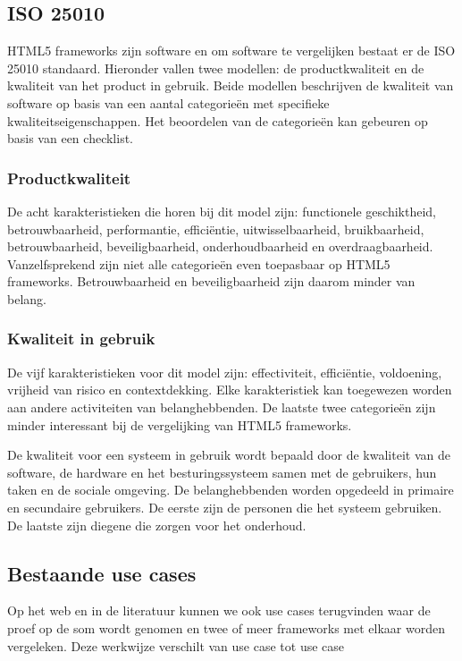 \subsection{ISO 25010}
HTML5 frameworks zijn software en om software te vergelijken bestaat er de ISO 25010 standaard.  Hieronder vallen twee modellen:  de productkwaliteit en de kwaliteit van het product in gebruik.  Beide modellen beschrijven de kwaliteit van software op basis van een aantal categorieën met specifieke kwaliteitseigenschappen. Het beoordelen van de categorieën kan gebeuren op basis van een checklist. 
 
\subsubsection{Productkwaliteit}
De acht karakteristieken die horen bij dit model zijn: functionele geschiktheid,  betrouwbaarheid,  performantie, efficiëntie, uitwisselbaarheid,  bruikbaarheid,  betrouwbaarheid, beveiligbaarheid,  onderhoudbaarheid en overdraagbaarheid.   Vanzelfsprekend zijn niet alle categorieën even toepasbaar op HTML5 frameworks.  Betrouwbaarheid en beveiligbaarheid zijn daarom minder van belang.

\subsubsection{Kwaliteit in gebruik}
De vijf karakteristieken voor dit model zijn: effectiviteit,  efficiëntie,  voldoening,  vrijheid van risico en contextdekking. Elke karakteristiek kan toegewezen worden aan andere activiteiten van belanghebbenden. De laatste twee categorieën zijn minder interessant bij de vergelijking van HTML5 frameworks.

De kwaliteit voor een systeem in gebruik wordt bepaald door de kwaliteit van de software,  de hardware en het besturingssysteem samen met de gebruikers, hun taken en de sociale omgeving.  De belanghebbenden worden opgedeeld in primaire en secundaire gebruikers.  De eerste zijn de personen die het systeem gebruiken. De laatste zijn diegene die zorgen voor het onderhoud.

\subsection{Bestaande use cases}
Op het web en in de literatuur kunnen we ook use cases terugvinden waar de proef op de som wordt genomen en twee of meer frameworks met elkaar worden vergeleken.  Deze werkwijze verschilt van use case tot use case

